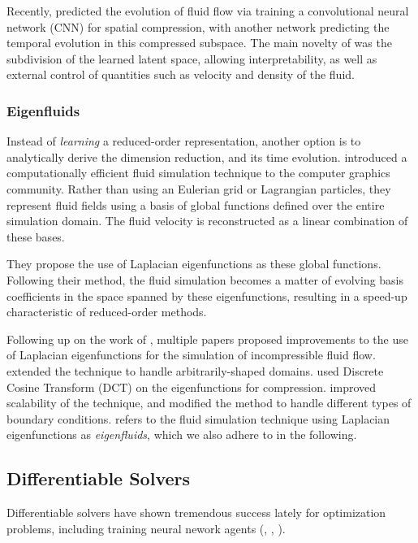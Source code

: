 Recently, \cite{LatentSpaceSubdivision} predicted the
evolution of fluid flow via training a convolutional neural network (CNN) for
spatial compression, with another network predicting the temporal evolution in
this compressed subspace.  The main novelty of \cite{LatentSpaceSubdivision} was
the subdivision of the learned latent space, allowing interpretability, as well
as external control of quantities such as velocity and density of the fluid.

\subsubsection*{Eigenfluids}
Instead of \textit{learning} a reduced-order representation, another option is
to analytically derive the dimension reduction, and its time evolution.
\cite{dewitt} introduced a computationally efficient fluid simulation technique
to the computer graphics community. Rather than using an Eulerian grid or
Lagrangian particles, they represent fluid fields using a basis of global
functions defined over the entire simulation domain. The fluid velocity is
reconstructed as a linear combination of these bases.

They propose the use of Laplacian eigenfunctions as these global functions.
Following their method, the fluid simulation becomes a matter of evolving basis
coefficients in the space spanned by these eigenfunctions, resulting in
a speed-up characteristic of reduced-order methods. 

Following up on the work of \cite{dewitt}, multiple papers proposed improvements
to the use of Laplacian eigenfunctions for the simulation of incompressible
fluid flow. \cite{ModelReductionFluidSim} extended the technique to handle
arbitrarily-shaped domains. \cite{EigenfluidCompression} used Discrete Cosine
Transform (DCT) on the eigenfunctions for compression.
\cite{scalable-eigenfluids} improved scalability of the technique, and modified
the method to handle different types of boundary conditions.
\cite{scalable-eigenfluids} refers to the fluid simulation technique using
Laplacian eigenfunctions as \textit{eigenfluids}, which we also adhere to in the
following.

\subsection{Differentiable Solvers}
Differentiable solvers have shown tremendous success lately for optimization
problems, including training neural nework agents
(\cite{holl2019pdecontrol}, \cite{difftaichi}, \cite{warp2022}).

